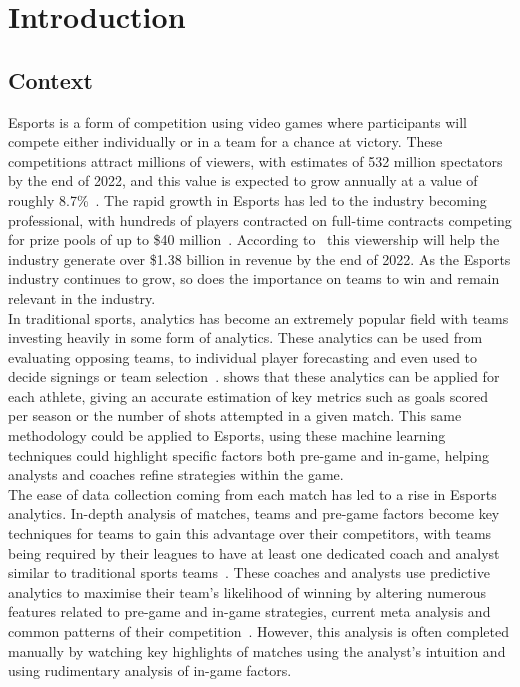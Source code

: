 \chapter{Introduction}\label{ch:introduction}
\section{Context}\label{sec:Context}
Esports is a form of competition using video games where participants will compete either individually or in a team for a chance at victory.
These competitions attract millions of viewers, with estimates of 532 million spectators by the end of 2022, and this value is expected to grow annually at a value of roughly 8.7\%~\citep{newzoo2022viewers}.
The rapid growth in Esports has led to the industry becoming professional, with hundreds of players contracted on full-time contracts competing for prize pools of up to \$40 million~\citep{esportsearnings}.
According to~\citet{newzoo2022viewers} this viewership will help the industry generate over \$1.38 billion in revenue by the end of 2022.
As the Esports industry continues to grow, so does the importance on teams to win and remain relevant in the industry.\\

In traditional sports, analytics has become an extremely popular field with teams investing heavily in some form of analytics.
These analytics can be used from evaluating opposing teams, to individual player forecasting and even used to decide signings or team selection~\citep{sarlis2020sports, apostolou2019sports}.
\citet{apostolou2019sports, sarlis2020sports} shows that these analytics can be applied for each athlete, giving an accurate estimation of key metrics such as goals scored per season or the number of shots attempted in a given match.
This same methodology could be applied to Esports, using these machine learning techniques could highlight specific factors both pre-game and in-game, helping analysts and coaches refine strategies within the game.\\

The ease of data collection coming from each match has led to a rise in Esports analytics.
In-depth analysis of matches, teams and pre-game factors become key techniques for teams to gain this advantage over their competitors, with teams being required by their leagues to have at least one dedicated coach and analyst similar to traditional sports teams~\citep{LCSRules}.
These coaches and analysts use predictive analytics to maximise their team's likelihood of winning by altering numerous features related to pre-game and in-game strategies, current \gls{meta} analysis and common patterns of their competition~\citep{kokkinakis2021metagaming}.
However, this analysis is often completed manually by watching key highlights of matches using the analyst's intuition and using rudimentary analysis of in-game factors.\\

